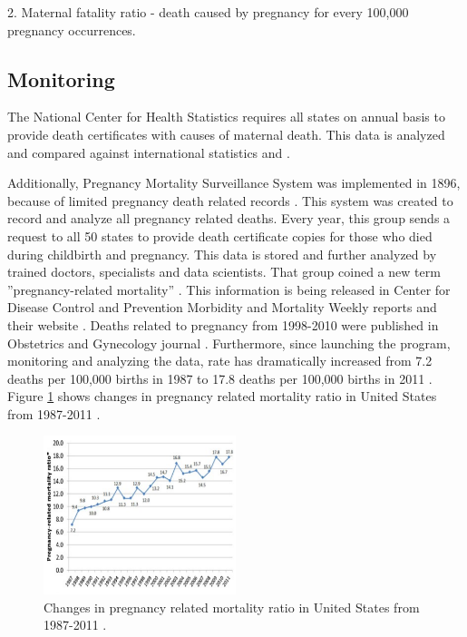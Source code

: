 \documentclass[sigconf]{acmart}
\begin{document}
2. Maternal fatality ratio - death caused by pregnancy for every 100,000 pregnancy occurrences.


\subsection{Monitoring}

The National Center for Health Statistics requires all states on annual basis to provide death certificates with causes of maternal death. This data is analyzed and compared against international statistics \cite{hoyert2007maternal} and \cite{creanga2014maternal}.

Additionally, Pregnancy Mortality Surveillance System was implemented in 1896, because of limited pregnancy death related records  \cite{horon2011effectiveness}. This system was created to record and analyze all pregnancy related deaths. Every year, this group sends a request to all 50 states to provide death certificate copies for those who died during childbirth and pregnancy. This data is stored and further analyzed by trained doctors, specialists and data scientists. That group coined a new term ''pregnancy-related mortality'' \cite{callaghan2012overview}. This information is being released in Center for Disease Control and Prevention Morbidity and Mortality Weekly reports and their website \cite{neggers2016trends}. Deaths related to pregnancy from 1998-2010 were published in Obstetrics and Gynecology journal \cite{schulz1994assessing}. Furthermore, since launching the program, monitoring and analyzing the data, rate has dramatically increased from 7.2 deaths per 100,000 births in 1987 to 17.8 deaths per 100,000 births in 2011 \cite{neggers2016trends}. Figure \ref{fig:figure3} shows changes in pregnancy related mortality ratio in United States from 1987-2011 \cite{centers2014pregnancyrelated}.

\begin{figure}
  \centering
  \includegraphics[width=0.5\textwidth]{images/figure3.pdf}
  \caption{Changes in pregnancy related mortality ratio in United States from 1987-2011 \cite{centers2014pregnancyrelated}.} \label{fig:figure3} 
\end{figure}
\end{document}
